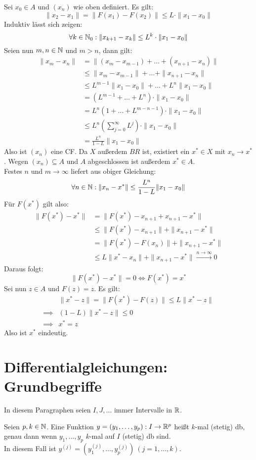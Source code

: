 \documentclass[a4paper,twoside,DIV15,BCOR12mm,chapterprefix=true,headings=twolinechapter]{scrbook}
\begin{document}
\begin{beweis}
Sei $x_0\in A$ und $(x_n)$ wie oben definiert. Es gilt:
\[\|x_2-x_1\|=\|F(x_1)-F(x_2)\|\le L\cdot \|x_1-x_0\|\]
Induktiv lässt sich zeigen:
\[\forall k\in\mathbb{N}_0: \|x_{k+1}-x_k\|\le L^k\cdot \|x_1-x_0\|\]
Seien nun $m,n\in\mathbb{N}$ und $m>n$, dann gilt:
\begin{align*}
\|x_m-x_n\| &= \|(x_m-x_{m-1})+\ldots+(x_{n+1}-x_n)\|\\
&\le \|x_m-x_{m-1}\|+\ldots+\|x_{n+1}-x_n\|\\
&\le L^{m-1}\|x_1-x_0\|+\ldots+L^n\|x_1-x_0\|\\
&=(L^{m-1}+\ldots+L^n)\cdot \|x_1-x_0\|\\
&= L^n(1+\ldots+L^{m-n-1})\cdot \|x_1-x_0\|\\
&\le L^n(\sum_{j=0}^\infty L^j)\cdot \|x_1-x_0\|\\
&= \frac{L^n}{1-L}\|x_1-x_0\|
\end{align*}
Also ist $(x_n)$ eine CF. Da $X$ außerdem $BR$ ist, existiert ein $x^*\in X$ mit
$x_n\to x^*$. Wegen $(x_n)\subseteq A$ und $A$ abgeschlossen ist außerdem $x^*\in A$.\\
Festes $n$ und $m\to\infty$ liefert aus obiger Gleichung:
\[\forall n\in\mathbb{N}:\|x_n-x^*\|\le \frac{L^n}{1-L}\|x_1-x_0\|\]
Für $F(x^*)$ gilt also:
\begin{align*}
\|F(x^*)-x^*\| &= \|F(x^*)-x_{n+1}+x_{n+1}-x^*\|\\
&\le \|F(x^*)-x_{n+1}\|+\|x_{n+1}-x^*\|\\
&=\|F(x^*)-F(x_n)\|+\|x_{n+1}-x^*\|\\
&\le L\|x^*-x_n\|+\|x_{n+1}-x^*\|\stackrel{n\to\infty}\to 0
\end{align*}
Daraus folgt:
\[\|F(x^*)-x^*\| = 0\iff F(x^*)=x^*\]
Sei nun $z\in A$ und $F(z)=z$. Es gilt:
\begin{align*}
&\|x^*-z\|=\|F(x^*)-F(z)\| \le L\|x^*-z\|\\
\implies &(1-L)\|x^*-z\| \le 0\\
\implies &x^*=z
\end{align*}
Also ist $x^*$ eindeutig.
\end{beweis}

\chapter{Differentialgleichungen: Grundbegriffe}
In diesem Paragraphen seien $I,J,\ldots$ immer Intervalle in $\mathbb{R}$.

\begin{erinnerung}
Seien $p,k\in\mathbb{N}$. Eine Funktion $y=(y_1,\ldots,y_p):I\to\mathbb{R}^p$ heißt
$k$-mal (stetig) db, genau dann wenn $y_1,\ldots,y_p$ $k$-mal auf $I$ (stetig)
db sind.\\
In diesem Fall ist $y^{(j)}=(y_1^{(j)},\ldots,y_p^{(j)})\ (j=1,\ldots,k)$.
\end{erinnerung}
\end{document}
